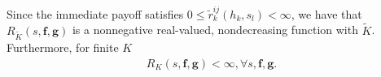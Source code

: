 \normalsize
Since the immediate payoff satisfies $0 \leq \tilde{r}_{k}^{ij}(h_{k},s_{l})< \infty$, we have that $R_{\tilde{K}}(s, \mathbf{f}, \mathbf{g})$ is a nonnegative real-valued, nondecreasing function with $\tilde{K}$. 
Furthermore, for finite $K$%
\vspace{-4pt}
\begin{align}
R_{K}(s,\mathbf{f}, \mathbf{g}) < \infty, \forall s, \mathbf{f}, \mathbf{g}.
\label{fR}
\end{align}
\iffalse
Define the lower (upper) value function $\underbar{$v$}_{K,s}$ ($\bar{v}_{K,s}$) of the stochastic game as:
\begin{align*}
\underbar{$v$}_{K,s}=\sup_{\mathbf{f}\in F^{K}}\inf_{\mathbf{g}\in G^{K}}R_{K}(s,\mathbf{f}, \mathbf{g}),\\
\bar{v}_{K,s}=\inf_{\mathbf{g}\in G^{K}}\sup_{\mathbf{f}\in F^{K}}R_{K}(s,\mathbf{f}, \mathbf{g})
\end{align*}  
\fi


